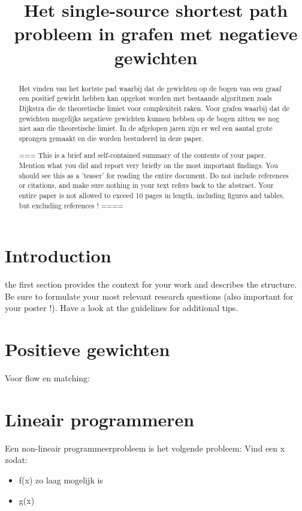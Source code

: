 \documentclass[conference]{IEEEtran}
\begin{document}
\title{Het single-source shortest path probleem in grafen met negatieve gewichten}

\author{
}

\maketitle

\begin{abstract}
Het vinden van het kortste pad waarbij dat de gewichten op de bogen van een graaf een positief gewicht hebben kan opgelost worden met bestaande algoritmen zoals Dijkstra die de theoretische limiet voor complexiteit raken. Voor grafen waarbij dat de gewichten mogelijks negatieve gewichten kunnen hebben op de bogen zitten we nog niet aan die theoretische limiet. In de afgelopen jaren zijn er wel een aantal grote sprongen gemaakt en die worden bestudeerd in deze paper.

===
This is a brief and self-contained summary of the contents of your paper. Mention what you did and report very briefly on the most important findings. You should see this as a 'teaser' for reading the entire document. Do not include references or citations, and make sure nothing in your text refers back to the abstract. Your entire paper is not allowed to exceed 10 pages in length, including figures and tables, but excluding references !
====
\end{abstract}

\section{Introduction}
the first section provides the context for your work and describes the structure. Be sure to formulate your most relevant research questions (also important for your poster !). Have a look at the guidelines for additional tips.

\section{Positieve gewichten}

Voor flow en matching:
\section{Lineair programmeren}
Een non-lineair programmeerprobleem is het volgende probleem:
Vind een x zodat:
\begin{itemize}
    \item f(x) zo laag mogelijk is
    \item g(x) \beq
\end{itemize}
\end{document}
